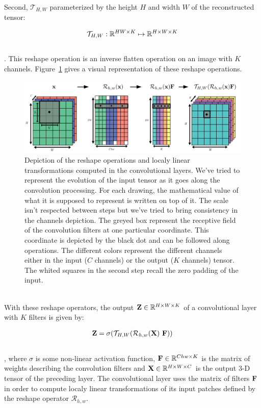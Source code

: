 \documentclass[12pt]{article}
\begin{document}
Second, $\mathcal{T}_{H, W}$ parameterized by the height $H$ and width $W$ of the reconstructed tensor:

\begin{align}
 \mathcal{T}_{H, W}: \mathbb{R}^{HW \times K} \mapsto \mathbb{R}^{H \times W \times K}
\end{align}
~\\
. This reshape operation is an inverse flatten operation on an image with $K$ channels.
Figure~\ref{fig:reshape} gives a visual representation of these reshape operations.

\begin{figure}[h]
\includegraphics[width=\textwidth]{figures/reshape.png}
\caption{Depiction of the reshape operations and localy linear transformations computed in the convolutional layers. We've tried to represent the evolution of the input tensor as it goes along the convolution processing. For each drawing, the mathematical value of what it is supposed to represent is written on top of it. The scale isn't respected between steps but we've tried to bring consistency in the channels depiction. The greyed box represent the receptive field of the convolution filters at one particular coordinate. This coordinate is depicted by the black dot and can be followed along operations. The different colors represent the different channels either in the input ($C$ channels) or the output ($K$ channels) tensor. The whited squares in the second step recall the zero padding of the input.}
\label{fig:reshape}
\end{figure}

~\\

With these reshape operators, the output ${\mathbf{Z}} \in \mathbb{R}^{H \times W \times K}$ of a convolutional layer with $K$ filters is given by:

\begin{align}
\label{eq:convo_comp}
 {\mathbf{Z}} = \sigma(\mathcal{T}_{H, W} (\mathcal{R}_{h, w}({\mathbf{X}})~{\mathbf{F}}))
\end{align}
~\\
, where $\sigma$ is some non-linear activation function, ${\mathbf{F}} \in \mathbb{R}^{Chw \times K}$ is the matrix of weights describing the convolution filters and ${\mathbf{X}} \in \mathbb{R}^{H \times W \times C}$ is the output 3-D tensor of the preceding layer. The convolutional layer uses the matrix of filters ${\mathbf{F}}$ in order to compute localy linear transformations of its input patches defined by the reshape operator $\mathcal{R}_{h, w}$.
\end{document}
